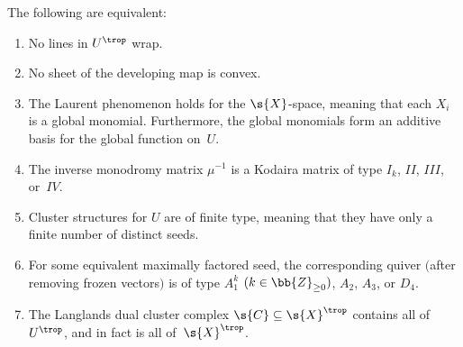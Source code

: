 \begin{thm}\label{no-wrap}
The following are equivalent:
\begin{enumerate}\itemsep=0pt
\item[$1.$] No {lines} in $U^{\trop}$ wrap.
\item[$2.$] No sheet of the {developing map} is convex.
\item[$3.$] The Laurent phenomenon holds for the $\s{X}$-space, meaning that each $X_i$ is a global monomial. Furthermore, the {global monomials} form an additive basis for the global function on~$U$.
\item[$4.$] The inverse {monodromy} matrix $\mu^{-1}$ is a Kodaira matrix of type $I_k$, $II$, $III$, or~$IV$.
\item[$5.$] Cluster structures for $U$ are of {finite type}, meaning that they have only a finite number of distinct seeds.
\item[$6.$] For some equivalent maximally factored seed, the corresponding quiver $($after removing frozen vectors$)$ is of type $A_1^k$ $(k\in \bb{Z}_{\geq 0})$, $A_2$, $A_3$, or $D_4$.
\item[$7.$] The Langlands dual {cluster complex} $\s{C}\subseteq \s{X}^{\trop}$ contains all of~$U^{\trop}$, and in fact is all of~$\s{X}^{\trop}$.
\end{enumerate}
\end{thm}
